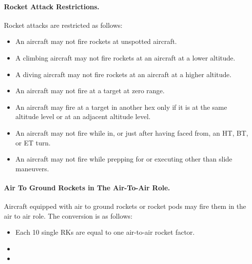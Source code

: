 \begin{advancedrules}
\paragraph{Rocket Attack Restrictions.} Rocket attacks are restricted as follows:

\begin{itemize}

    \item An aircraft may not fire rockets at unspotted aircraft.

    \item A climbing aircraft may not fire rockets at an aircraft at a lower altitude.

    \item A diving aircraft may not fire rockets at an aircraft at a higher altitude.

    \item An aircraft may not fire at a target at zero range.

    \item An aircraft  may fire at a target in another hex only if it is at the same altitude level or at an adjacent altitude level.

    \item An aircraft may not fire while in, or just after having faced from, an HT, BT, or ET turn.

    \item An aircraft may not fire while prepping for or executing other than slide maneuvers.

\end{itemize}


\paragraph{Air To Ground Rockets in The Air-To-Air Role.} Aircraft equipped with air to ground rockets or rocket pods may fire them in the air to air role. The conversion is as follows:

\begin{itemize}
    \item Each 10 single RKs are equal to one air-to-air rocket factor.	
    \item {}
    \item {}
\end{itemize}


\end{advancedrules}
